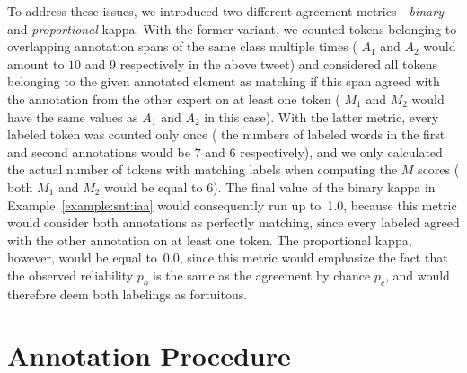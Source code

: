 To address these issues, we introduced two different agreement
metrics---\emph{binary} and \emph{proportional} kappa.  With the
former variant, we counted tokens belonging to overlapping annotation
spans of the same class multiple times (\ie{} $A_1$ and $A_2$ would
amount to $10$ and $9$ respectively in the above tweet) and considered
all tokens belonging to the given annotated element as matching if
this span agreed with the annotation from the other expert on at least
one token (\ie{} $M_1$ and $M_2$ would have the same values as $A_1$
and $A_2$ in this case).  With the latter metric, every labeled token
was counted only once (\ie{} the numbers of labeled words in the first
and second annotations would be $7$ and $6$ respectively), and we only
calculated the actual number of tokens with matching labels when
computing the $M$ scores (\ie{} both $M_1$ and $M_2$ would be equal to
$6$).  The final value of the binary kappa in
Example~\ref{example:snt:iaa} would consequently run up to~1.0,
because this metric would consider both annotations as perfectly
matching, since every labeled  agreed with the
other annotation on at least one token.  The proportional kappa,
however, would be equal to~0.0, since this metric would emphasize the
fact that the observed reliability $p_o$ is the same as the agreement
by chance $p_c$, and would therefore deem both labelings as
fortuitous.

\section{Annotation Procedure}\label{sec:astages}

